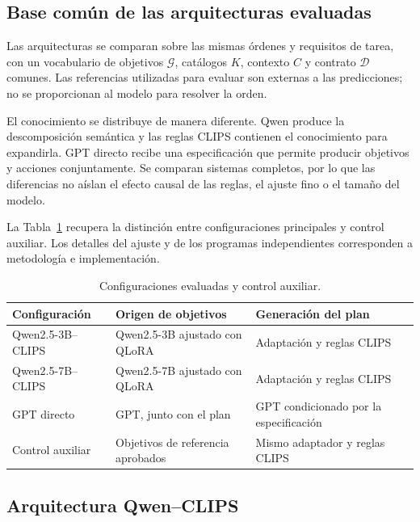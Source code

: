 \subsection{Base común de las arquitecturas evaluadas}
\label{subsec:base_comun_arquitecturas}

Las arquitecturas se comparan sobre las mismas órdenes y requisitos de tarea, con un vocabulario de objetivos $\mathcal{G}$, catálogos $K$, contexto $C$ y contrato $\mathcal{D}$ comunes. Las referencias utilizadas para evaluar son externas a las predicciones; no se proporcionan al modelo para resolver la orden.

El conocimiento se distribuye de manera diferente. Qwen produce la descomposición semántica y las reglas CLIPS contienen el conocimiento para expandirla. GPT directo recibe una especificación que permite producir objetivos y acciones conjuntamente. Se comparan sistemas completos, por lo que las diferencias no aíslan el efecto causal de las reglas, el ajuste fino o el tamaño del modelo.

La Tabla~\ref{tab:configuraciones} recupera la distinción entre configuraciones principales y control auxiliar. Los detalles del ajuste y de los programas independientes corresponden a metodología e implementación.

\begin{table}[htbp]
\centering
\small
\caption{Configuraciones evaluadas y control auxiliar.}
\label{tab:configuraciones}
\begin{tabularx}{\textwidth}{@{}XXX@{}}
\toprule
\textbf{Configuración} & \textbf{Origen de objetivos} & \textbf{Generación del plan} \\
\midrule
Qwen2.5-3B--CLIPS & Qwen2.5-3B ajustado con QLoRA & Adaptación y reglas CLIPS \\
\addlinespace
Qwen2.5-7B--CLIPS & Qwen2.5-7B ajustado con QLoRA & Adaptación y reglas CLIPS \\
\addlinespace
GPT directo & GPT, junto con el plan & GPT condicionado por la especificación \\
\addlinespace
Control auxiliar & Objetivos de referencia aprobados & Mismo adaptador y reglas CLIPS \\
\bottomrule
\end{tabularx}
\end{table}

\subsection{Arquitectura Qwen--CLIPS}
\label{subsec:qwen_clips}

